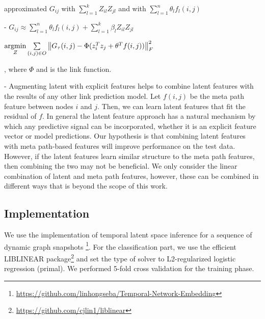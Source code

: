 \cite{Zhu2016} approximated $G_{ij}$ with $\sum_{l=1}^{k} Z_{il}Z_{jl}$ and \cite{sun2011pathsim} with $\sum_{l=1}^{n} \theta_l f_l(i,j)$


- $G_{ij} \approx  \sum_{l=1}^{n} \theta_l f_l(i,j) + \sum_{l=1}^{k} \beta_l Z_{il}Z_{jl}$



$ \operatorname*{argmin}\limits_{Z} \sum\limits_{(i,j)\in O} \left \| G_\tau(i,j) - \Phi(z_{i}^Tz_{j} + \theta^Tf(i,j)) \right \|^2_F $

, where $\Phi$ and is the link function.

- Augmenting latent with explicit features helps to combine latent features with the results of any other link prediction model. Let $f(i,j)$ be the meta path feature between nodes $i$ and $j$. Then, we can learn latent features that fit the residual of $f$. In general the latent feature approach has a natural mechanism by which any predictive signal can be incorporated, whether it is an explicit feature vector or model predictions. Our hypothesis is that combining latent features with meta path-based features will improve performance on the test data. However, if the latent features learn similar structure to the meta path features, then combining the two may not be beneficial. We only consider the linear combination of latent and meta path features, however, these can be combined in different ways that is beyond the scope of this work.

\subsection{Implementation}

We use the implementation of temporal latent space inference for a sequence of dynamic graph snapshots \footnote{\url{https://github.com/linhongseba/Temporal-Network-Embedding}}\cite{Zhu2016}.
 For the classification part, we use the efficient LIBLINEAR \cite{fan2008liblinear} package\footnote{\url{https://github.com/cjlin1/liblinear}} and set the type of solver to L2-regularized logistic regression (primal). %
We performed 5-fold cross validation for the training phase.



